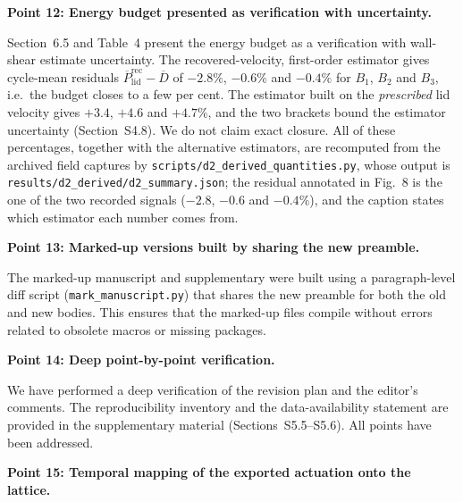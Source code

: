 \documentclass[11pt,a4paper]{article}
\newcommand{\brk}{\hspace{0pt}}
\begin{document}
\noindent\textbf{Point 12: Energy budget presented as verification with
uncertainty.}

Section~6.5 and Table~4 present the energy budget as a verification with
wall-shear estimate uncertainty. The recovered-velocity, first-order estimator
gives cycle-mean residuals $\overline{P}_{\mathrm{lid}}^{\mathrm{rec}}-\overline{D}$ of
$-2.8\%$, $-0.6\%$ and $-0.4\%$ for $B_1$, $B_2$ and $B_3$, i.e.\ the budget
closes to a few per cent. The estimator built on the \emph{prescribed} lid
velocity gives $+3.4$, $+4.6$ and $+4.7\%$, and the two brackets bound the
estimator uncertainty (Section~S4.8). We do not claim exact closure. All of these
percentages, together with the alternative estimators, are recomputed from the
archived field captures by
\texttt{scripts/d2\_derived\_quantities\brk.py}, whose output is
\texttt{results/d2\_derived/d2\_summary.json}; the residual annotated in Fig.~8 is
the one of the two recorded signals ($-2.8$, $-0.6$ and $-0.4\%$), and the caption
states which estimator each number comes from.

\vspace{0.5em}

\noindent\textbf{Point 13: Marked-up versions built by sharing the new preamble.}

The marked-up manuscript and supplementary were built using a paragraph-level
diff script (\texttt{mark\_manuscript.py}) that shares the new preamble for both
the old and new bodies. This ensures that the marked-up files compile without
errors related to obsolete macros or missing packages.

\vspace{0.5em}

\noindent\textbf{Point 14: Deep point-by-point verification.}

We have performed a deep verification of the revision plan and the editor's
comments. The reproducibility inventory and the data-availability statement are
provided in the supplementary material
(Sections~S5.5--S5.6). All points have been addressed.

\vspace{0.5em}

\noindent\textbf{Point 15: Temporal mapping of the exported actuation onto the
lattice.}
\end{document}
